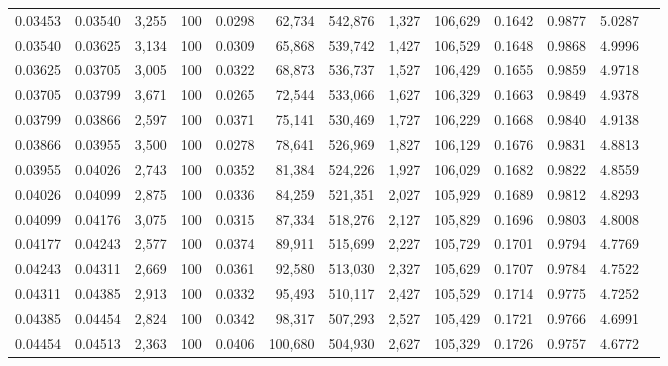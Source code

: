 \begin{tabular}{rrrrrrrrrrrrr}
0.03453 & 0.03540 & 3,255 & 100 &                                     0.0298 &  62,734 & 542,876 &   1,327 & 106,629 & 0.1642 & 0.9877 & 5.0287 \\
0.03540 & 0.03625 & 3,134 & 100 &                                     0.0309 &  65,868 & 539,742 &   1,427 & 106,529 & 0.1648 & 0.9868 & 4.9996 \\
0.03625 & 0.03705 & 3,005 & 100 &                                     0.0322 &  68,873 & 536,737 &   1,527 & 106,429 & 0.1655 & 0.9859 & 4.9718 \\
0.03705 & 0.03799 & 3,671 & 100 &                                     0.0265 &  72,544 & 533,066 &   1,627 & 106,329 & 0.1663 & 0.9849 & 4.9378 \\
0.03799 & 0.03866 & 2,597 & 100 &                                     0.0371 &  75,141 & 530,469 &   1,727 & 106,229 & 0.1668 & 0.9840 & 4.9138 \\
0.03866 & 0.03955 & 3,500 & 100 &                                     0.0278 &  78,641 & 526,969 &   1,827 & 106,129 & 0.1676 & 0.9831 & 4.8813 \\
0.03955 & 0.04026 & 2,743 & 100 &                                     0.0352 &  81,384 & 524,226 &   1,927 & 106,029 & 0.1682 & 0.9822 & 4.8559 \\
0.04026 & 0.04099 & 2,875 & 100 &                                     0.0336 &  84,259 & 521,351 &   2,027 & 105,929 & 0.1689 & 0.9812 & 4.8293 \\
0.04099 & 0.04176 & 3,075 & 100 &                                     0.0315 &  87,334 & 518,276 &   2,127 & 105,829 & 0.1696 & 0.9803 & 4.8008 \\
0.04177 & 0.04243 & 2,577 & 100 &                                     0.0374 &  89,911 & 515,699 &   2,227 & 105,729 & 0.1701 & 0.9794 & 4.7769 \\
0.04243 & 0.04311 & 2,669 & 100 &                                     0.0361 &  92,580 & 513,030 &   2,327 & 105,629 & 0.1707 & 0.9784 & 4.7522 \\
0.04311 & 0.04385 & 2,913 & 100 &                                     0.0332 &  95,493 & 510,117 &   2,427 & 105,529 & 0.1714 & 0.9775 & 4.7252 \\
0.04385 & 0.04454 & 2,824 & 100 &                                     0.0342 &  98,317 & 507,293 &   2,527 & 105,429 & 0.1721 & 0.9766 & 4.6991 \\
0.04454 & 0.04513 & 2,363 & 100 &                                     0.0406 & 100,680 & 504,930 &   2,627 & 105,329 & 0.1726 & 0.9757 & 4.6772 \\

\end{tabular}
